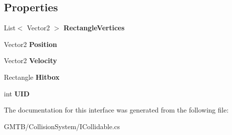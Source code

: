 \subsection*{Properties}
\begin{DoxyCompactItemize}
\item 
\mbox{\label{interface_g_m_t_b_1_1_collision_system_1_1_i_collidable_aceffd1c84c62bae752ae840710e25a13}} 
List$<$ Vector2 $>$ {\bfseries Rectangle\+Vertices}
\item 
\mbox{\label{interface_g_m_t_b_1_1_collision_system_1_1_i_collidable_a8b7b937e2e530412e2eb2a9a1ba9d912}} 
Vector2 {\bfseries Position}
\item 
\mbox{\label{interface_g_m_t_b_1_1_collision_system_1_1_i_collidable_aa8a23657d4e01f17e2de3f5cd46cb975}} 
Vector2 {\bfseries Velocity}
\item 
\mbox{\label{interface_g_m_t_b_1_1_collision_system_1_1_i_collidable_a1cfd47dc5fc27c35679afb1b932dc7cf}} 
Rectangle {\bfseries Hitbox}
\item 
\mbox{\label{interface_g_m_t_b_1_1_collision_system_1_1_i_collidable_a2a0dfb5b30651b63dd909b20392bfae0}} 
int {\bfseries U\+ID}
\end{DoxyCompactItemize}


The documentation for this interface was generated from the following file\+:\begin{DoxyCompactItemize}
\item 
G\+M\+T\+B/\+Collision\+System/I\+Collidable.\+cs\end{DoxyCompactItemize}
